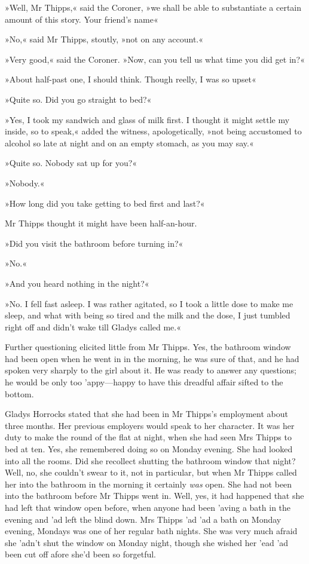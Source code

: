 »Well, Mr Thipps,« said the Coroner, »we shall be able to substantiate a certain amount of this story. Your friend's name\longdash«

»No,« said Mr Thipps, stoutly, »not on any account.«

»Very good,« said the Coroner. »Now, can you tell us what time you did get in?«

»About half-past one, I should think. Though reelly, I was so upset\longdash«

»Quite so. Did you go straight to bed?«

»Yes, I took my sandwich and glass of milk first. I thought it might settle my inside, so to speak,« added the witness, apologetically, »not being accustomed to alcohol so late at night and on an empty stomach, as you may say.«

»Quite so. Nobody sat up for you?«

»Nobody.«

»How long did you take getting to bed first and last?«

Mr Thipps thought it might have been half-an-hour.

»Did you visit the bathroom before turning in?«

»No.«

»And you heard nothing in the night?«

»No. I fell fast asleep. I was rather agitated, so I took a little dose to make me sleep, and what with being so tired and the milk and the dose, I just tumbled right off and didn't wake till Gladys called me.«

Further questioning elicited little from Mr Thipps. Yes, the bathroom window had been open when he went in in the morning, he was sure of that, and he had spoken very sharply to the girl about it. He was ready to answer any questions; he would be only too 'appy—happy to have this dreadful affair sifted to the bottom.

Gladys Horrocks stated that she had been in Mr Thipps's employment about three months. Her previous employers would speak to her character. It was her duty to make the round of the flat at night, when she had seen Mrs Thipps to bed at ten. Yes, she remembered doing so on Monday evening. She had looked into all the rooms. Did she recollect shutting the bathroom window that night? Well, no, she couldn't swear to it, not in particular, but when Mr Thipps called her into the bathroom in the morning it certainly \textit{was} open. She had not been into the bathroom before Mr Thipps went in. Well, yes, it had happened that she had left that window open before, when anyone had been 'aving a bath in the evening and 'ad left the blind down. Mrs Thipps 'ad 'ad a bath on Monday evening, Mondays was one of her regular bath nights. She was very much afraid she 'adn't shut the window on Monday night, though she wished her 'ead 'ad been cut off afore she'd been so forgetful.

